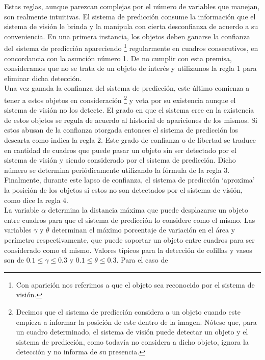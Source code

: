 Estas reglas, aunque parezcan complejas por el n\'umero de variables que 
manejan, son realmente intuitivas. El sistema de predicci\'on consume la 
informaci\'on que el sistema de visi\'on le brinda y la manipula con 
cierta desconfianza de acuerdo a su 
conveniencia. En una primera instancia, los objetos deben ganarse la 
confianza del sistema de predicci\'on apareciendo \footnote{Con 
aparici\'on nos referimos a que el objeto sea reconocido por el sistema 
de visi\'on.} regularmente en 
cuadros consecutivos, en concordancia con la asunci\'on n\'umero 
1. De no cumplir con esta premisa, consideramos que no se trata de un 
objeto de inter\'es y utilizamos la regla 1 para eliminar dicha detecci\'on. \\
	Una vez ganada la confianza del sistema de predicci\'on, este 
	\'ultimo comienza a tener a estos objetos en consideraci\'on 
	\footnote{Decimos que el sistema de predicci\'on considera a un 
	objeto cuando este empieza a informar la posici\'on de este dentro de la 
	imagen. N\'otese que, para un cuadro determinado, el sistema de 
	visi\'on puede detectar un objeto y el sistema de predicci\'on, como 
	todav\'ia no considera a dicho objeto, ignora la detecci\'on y no informa de su 
	presencia.} y veta por su 
existencia aunque el sistema de visi\'on no los detecte. El grado en que 
el sistema cree en la existencia de estos objetos se regula de 
acuerdo al historial de apariciones de los mismos. Si estos abusan de 
la confianza otorgada entonces el sistema de predicci\'on los descarta 
como indica la regla 2. 
Este grado de confianza o de libertad se traduce en cantidad de 
cuadros que puede pasar un objeto sin ser detectado por el sistema de 
visi\'on y siendo considerado por el sistema de predicci\'on. Dicho 
n\'umero se determina peri\'odicamente utilizando la f\'ormula de la regla 3.
Finalmente, durante este lapso de confianza, el sistema de predicci\'on 
`aproxima' la posici\'on de los objetos si estos no son detectados por el 
sistema de visi\'on, como dice la regla 4. \\
\indent La variable $\alpha$ determina la distancia m\'axima que puede 
desplazarse un objeto entre cuadros para que el sistema de predicci\'on lo considere 
como el mismo. Las variables $\gamma$ y $\theta$ determinan el m\'aximo 
porcentaje de variaci\'on en el \'area y per\'imetro respectivamente, que puede soportar un 
objeto entre cuadros para ser considerado como el mismo. Valores 
t\'ipicos para la detecci\'on de colillas y vasos son de 
$0.1\leq\gamma\leq0.3$ y $0.1\leq\theta\leq0.3$. Para el caso de 
